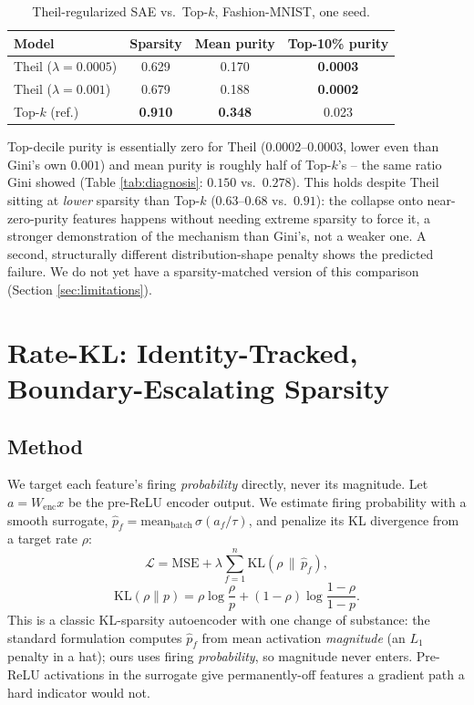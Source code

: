 \documentclass[11pt,twocolumn]{article}
\begin{document}
\begin{table}[h]
\centering
\caption{Theil-regularized SAE vs.\ Top-$k$, Fashion-MNIST, one seed.}
\label{tab:theil}
\begin{tabular}{@{}lccc@{}}
\toprule
Model & Sparsity & Mean purity & Top-10\% purity \\ \midrule
Theil ($\lambda{=}0.0005$) & 0.629 & 0.170 & \textbf{0.0003} \\
Theil ($\lambda{=}0.001$) & 0.679 & 0.188 & \textbf{0.0002} \\
Top-$k$ (ref.) & \textbf{0.910} & \textbf{0.348} & 0.023 \\ \bottomrule
\end{tabular}
\end{table}

Top-decile purity is essentially zero for Theil ($0.0002$--$0.0003$, lower even than Gini's own $0.001$) and mean purity is roughly half of Top-$k$'s -- the same ratio Gini showed (Table \ref{tab:diagnosis}: $0.150$ vs.\ $0.278$). This holds despite Theil sitting at \emph{lower} sparsity than Top-$k$ ($0.63$--$0.68$ vs.\ $0.91$): the collapse onto near-zero-purity features happens without needing extreme sparsity to force it, a stronger demonstration of the mechanism than Gini's, not a weaker one. A second, structurally different distribution-shape penalty shows the predicted failure. We do not yet have a sparsity-matched version of this comparison (Section \ref{sec:limitations}).

\section{Rate-KL: Identity-Tracked, Boundary-Escalating Sparsity}
\label{sec:ratekl}

\subsection{Method}
We target each feature's firing \emph{probability} directly, never its magnitude. Let $a = W_{\mathrm{enc}}x$ be the pre-ReLU encoder output. We estimate firing probability with a smooth surrogate, $\hat p_f = \mathrm{mean}_{\mathrm{batch}}\,\sigma(a_f/\tau)$, and penalize its KL divergence from a target rate $\rho$:
\begin{equation}
\mathcal{L} = \mathrm{MSE} + \lambda\sum_{f=1}^n \mathrm{KL}(\rho\,\|\,\hat p_f),
\label{eq:ratekl}
\end{equation}
\begin{equation*}
\mathrm{KL}(\rho\|p) = \rho\log\frac{\rho}{p} + (1{-}\rho)\log\frac{1{-}\rho}{1{-}p}.
\end{equation*}
This is a classic KL-sparsity autoencoder \citep{ng2011sparse} with one change of substance: the standard formulation computes $\hat p_f$ from mean activation \emph{magnitude} (an $L_1$ penalty in a hat); ours uses firing \emph{probability}, so magnitude never enters. Pre-ReLU activations in the surrogate give permanently-off features a gradient path a hard indicator would not.
\end{document}
